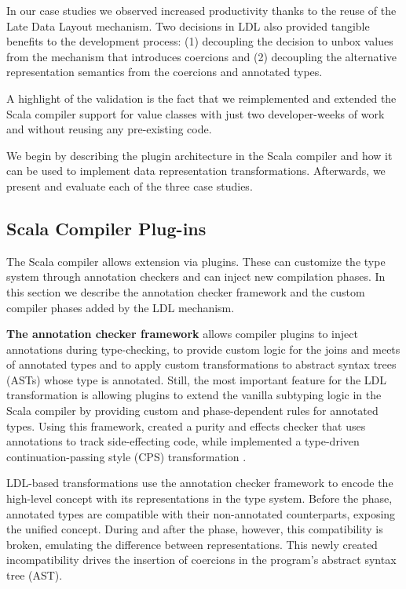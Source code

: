 In our case studies we observed increased productivity thanks to the reuse of the Late Data Layout mechanism. Two decisions in LDL also provided tangible benefits to the development process: (1) decoupling the decision to unbox values from the mechanism that introduces coercions and (2) decoupling the alternative representation semantics from the coercions and annotated types.

A highlight of the validation is the fact that we reimplemented and extended the Scala compiler support for value classes \cite{sip-value-classes} with just two developer-weeks of work and without reusing any pre-existing code.

We begin by describing the plugin architecture in the Scala compiler and how it can be used to implement data representation transformations. Afterwards, we present and evaluate each of the three case studies.

\subsection{Scala Compiler Plug-ins}
\label{ldl:sec:validation/plugins}
The Scala compiler allows extension via plugins. These can customize the type system through annotation checkers and can inject new compilation phases. In this section we describe the annotation checker framework and the custom compiler phases added by the LDL mechanism.

\textbf{The annotation checker framework} allows compiler plugins to inject annotations during type-checking, to provide custom logic for the joins and meets of annotated types and to apply custom transformations to abstract syntax trees (ASTs) whose type is annotated. Still, the most important feature for the LDL transformation is allowing plugins to extend the vanilla subtyping logic in the Scala compiler by providing custom and phase-dependent rules for annotated types. Using this framework,  created a purity and effects checker \cite{lukas-thesis} that uses annotations to track side-effecting code, while  implemented a type-driven continuation-passing style (CPS) transformation \cite{tiark-cps}.

LDL-based transformations use the annotation checker framework to encode the high-level concept with its representations in the type system. Before the \coerce{} phase, annotated types are compatible with their non-annotated counterparts, exposing the unified concept. During and after the \coerce{} phase, however, this compatibility is broken, emulating the difference between representations. This newly created incompatibility drives the insertion of coercions in the program's abstract syntax tree (AST).

